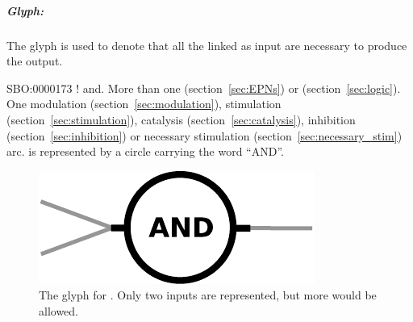 \subparagraph{Glyph: }\label{sec:and}

The glyph  is used to denote that all the  linked as input are necessary to produce the output.  

\begin{glyphDescription}
 \glyphSboTerm SBO:0000173 ! and.
 \glyphOrigin More than one  (section~\ref{sec:EPNs}) or  (section~\ref{sec:logic}).
 \glyphTarget  One modulation (section~\ref{sec:modulation}), stimulation (section~\ref{sec:stimulation}), catalysis (section~\ref{sec:catalysis}), inhibition (section~\ref{sec:inhibition}) or necessary stimulation (section~\ref{sec:necessary_stim}) arc.
 \glyphNode {} is represented by a circle carrying the word ``AND''.
\end{glyphDescription}

\begin{figure}[H]
  \centering
  \includegraphics[scale = 0.5]{images/and}
  \caption{The \PD glyph for . Only two inputs are represented, but more would be allowed.}
  \label{fig:and}
\end{figure}


% 
\normalcolor
